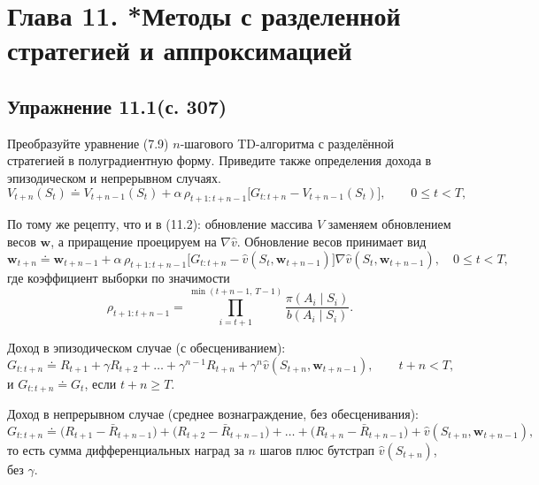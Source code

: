 \section{Глава 11. *Методы с разделенной стратегией и аппроксимацией}

\subsection{Упражнение 11.1(с. 307)}
Преобразуйте уравнение (7.9) $n$-шагового TD-алгоритма с разделённой стратегией в
полуградиентную форму. Приведите также определения дохода в эпизодическом и
непрерывном случаях.
\begin{equation}
    V_{t+n}(S_t) \doteq V_{t+n-1}(S_t) + \alpha\,\rho_{t+1:t+n-1}
    \big[G_{t:t+n} - V_{t+n-1}(S_t)\big], \qquad 0 \le t < T,
    \tag{7.9}
\end{equation}
\begin{solution}
    По тому же рецепту, что и в (11.2): обновление массива $V$ заменяем
    обновлением весов $\mathbf w$, а приращение проецируем на $\nabla\hat v$.
    Обновление весов принимает вид
    \begin{equation*}
        \mathbf w_{t+n} \doteq \mathbf w_{t+n-1} + \alpha\,\rho_{t+1:t+n-1}
        \big[G_{t:t+n} - \hat v(S_t,\mathbf w_{t+n-1})\big]\nabla\hat v(S_t,\mathbf w_{t+n-1}),
        \quad 0\le t<T,
    \end{equation*}
    где коэффициент выборки по значимости
    \begin{equation*}
        \rho_{t+1:t+n-1} = \prod_{i=t+1}^{\min(t+n-1,\,T-1)} \frac{\pi(A_i\mid S_i)}{b(A_i\mid S_i)}.
    \end{equation*}

    Доход в эпизодическом случае (с обесцениванием):
    \begin{equation*}
        G_{t:t+n} \doteq R_{t+1} + \gamma R_{t+2} + \dots + \gamma^{n-1} R_{t+n}
        + \gamma^n \hat v(S_{t+n},\mathbf w_{t+n-1}), \qquad t+n < T,
    \end{equation*}
    и $G_{t:t+n} \doteq G_t$, если $t+n\ge T$.

    Доход в непрерывном случае (среднее вознаграждение, без обесценивания):
    \begin{equation*}
        G_{t:t+n} \doteq \big(R_{t+1}-\bar R_{t+n-1}\big) + \big(R_{t+2}-\bar R_{t+n-1}\big)
        + \dots + \big(R_{t+n}-\bar R_{t+n-1}\big) + \hat v(S_{t+n},\mathbf w_{t+n-1}),
    \end{equation*}
    то есть сумма дифференциальных наград за $n$ шагов плюс бутстрап $\hat
    v(S_{t+n})$, без $\gamma$.
\end{solution}


